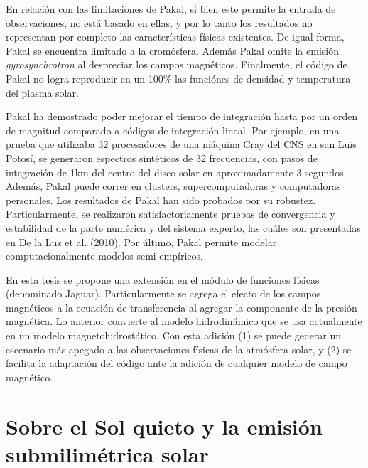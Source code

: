 En relaci\'on con las limitaciones de Pakal, si bien este permite la entrada de observaciones, no est\'a basado en ellas, y por lo tanto los resultados no representan por completo las caracter\'isticas f\'isicas existentes. De igual forma, Pakal se encuentra limitado a la crom\'osfera. Adem\'as Pakal omite la emisi\'on \emph{gyrosynchrotron} al despreciar los campos magn\'eticos. Finalmente, el c\'odigo de Pakal no logra reproducir en un 100\% las funci\'ones de densidad y temperatura del plasma solar.
 
Pakal ha demostrado poder mejorar el tiempo de integraci\'on hasta por un orden de magnitud comparado a c\'odigos de integraci\'on lineal. Por ejemplo, en una prueba que utilizaba 32 procesadores de una m\'aquina Cray del CNS en san Luis Potos\'i, se generaron espectros sint\'eticos de 32 frecuencias, con pasos de integraci\'on de 1km del centro del disco solar en aproximadamente 3 segundos. Adem\'as, Pakal puede correr en clusters, supercomputadoras y computadoras personales. Los resultados de Pakal han sido probados por su robustez. Particularmente, se realizaron satisfactoriamente pruebas de convergencia y estabilidad de la parte num\'erica y del sistema experto, las cu\'ales son presentadas en De la Luz et al. (2010). Por \'ultimo, Pakal permite modelar computacionalmente modelos semi emp\'iricos. 

En esta tesis se propone una extensi\'on en el m\'odulo de funciones f\'isicas (denominado Jaguar). Particularmente se agrega el efecto de los campos magn\'eticos a la ecuaci\'on de transferencia al agregar la componente de la presi\'on magn\'etica. Lo anterior convierte al modelo hidrodin\'amico que se usa actualmente en un modelo magnetohidrost\'atico. Con esta adici\'on (1) se puede generar un escenario m\'as apegado a las observaciones f\'isicas de la atm\'osfera solar, y (2) se facilita la adaptaci\'on del c\'odigo ante la adici\'on de cualquier modelo de campo magn\'etico.



\section{Sobre el Sol quieto y la emisi\'on submilim\'etrica solar}

